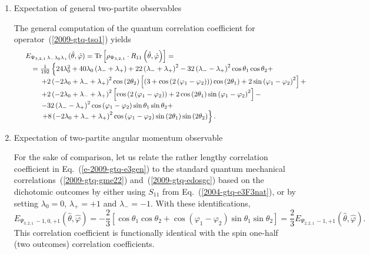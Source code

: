\documentclass[fleqn,twoside]{article}      %
\begin{document}
\begin{enumerate}

\item{Expectation of general two-partite observables}

The  general computation of the quantum correlation coefficient for operator~(\ref{2009-gtq-tso1})
yields
\begin{equation}
\begin{array}{ll}
&E_{{ \Psi_{3,2,1}}\,\lambda_- \lambda_0 \lambda_+ } ({\hat \theta},{\hat \varphi} )= {\rm Tr}\left[\rho_{ \Psi_{3,2,1}} \cdot R_{1 1} \left({\hat \theta},{\hat \varphi} \right)\right] =\\
& \quad   =  \frac{1}{192} \left\{24 \lambda_0^2 + 40 \lambda_0 \left(\lambda_- + \lambda_+\right) + 22 \left(\lambda_- + \lambda_+\right)^2 -
   32 \left(\lambda_- - \lambda_+\right)^2 \cos \theta_1  \cos \theta_2  +   \right.                                                                                     \\
& \qquad \; + 2 \left(-2 \lambda_0 + \lambda_- + \lambda_+\right)^2 \cos\left(2  \theta_2 \right) \left[\left(3 + \cos\left(2 \left( \varphi_1  -
  \varphi_2 \right)\right)\right) \cos\left(2  \theta_1 \right) + 2 \sin\left( \varphi_1  -  \varphi_2 \right)^2\right] +                                          \\
& \qquad \; +  2 \left(-2 \lambda_0 + \lambda_- + \lambda_+\right)^2 \left[\cos\left(2 \left( \varphi_1  -  \varphi_2 \right)\right) +
     2 \cos\left(2  \theta_1 \right) \sin\left( \varphi_1  -  \varphi_2 \right)^2\right] -                                                                         \\
& \qquad \; -32 \left(\lambda_- - \lambda_+\right)^2 \cos\left( \varphi_1  -  \varphi_2 \right) \sin \theta_1  \sin \theta_2  +    \\
& \qquad \; \left.   + 8 \left(-2 \lambda_0 + \lambda_- + \lambda_+\right)^2 \cos\left( \varphi_1  -  \varphi_2 \right) \sin\left(2  \theta_1 \right) \sin\left(2  \theta_2 \right)\right\}
.
\end{array}
\label{e-2009-gtq-e3gen}
\end{equation}

\item{Expectation of two-partite angular momentum observable}

For the sake of comparison, let us relate the rather lengthy
correlation coefficient in Eq.~(\ref{e-2009-gtq-e3gen})
to the standard  quantum mechanical correlations~(\ref{2009-gtq-gme22})
and~(\ref{2009-gtq-edosgc}) based on the dichotomic outcomes
by either using $ S_{1 1 }$ from Eq.~(\ref{2004-gtq-e3F3nat}),
or by setting $\lambda_0 = 0$, $  \lambda_+ = +1$ and  $\lambda_- =-1$.
With these identifications,
\begin{equation}
E_{{ \Psi_{3,2,1}}\,-1, 0, +1 } ({\hat \theta},{\hat \varphi} )= -\frac{2}{3}
\left[\cos \theta_1 \cos \theta_2 + \cos (\varphi_1 - \varphi_2) \sin \theta_1 \sin \theta_2\right]
= \frac{2}{3}E_{{ \Psi_{2,2,1}}\,-1, +1 } ({\hat \theta},{\hat \varphi} )
\label{2009-gtq-edosgc3}
.
\end{equation}
This correlation coefficient is functionally identical with the spin one-half (two outcomes) correlation coefficients.


\end{enumerate}
\end{document}
